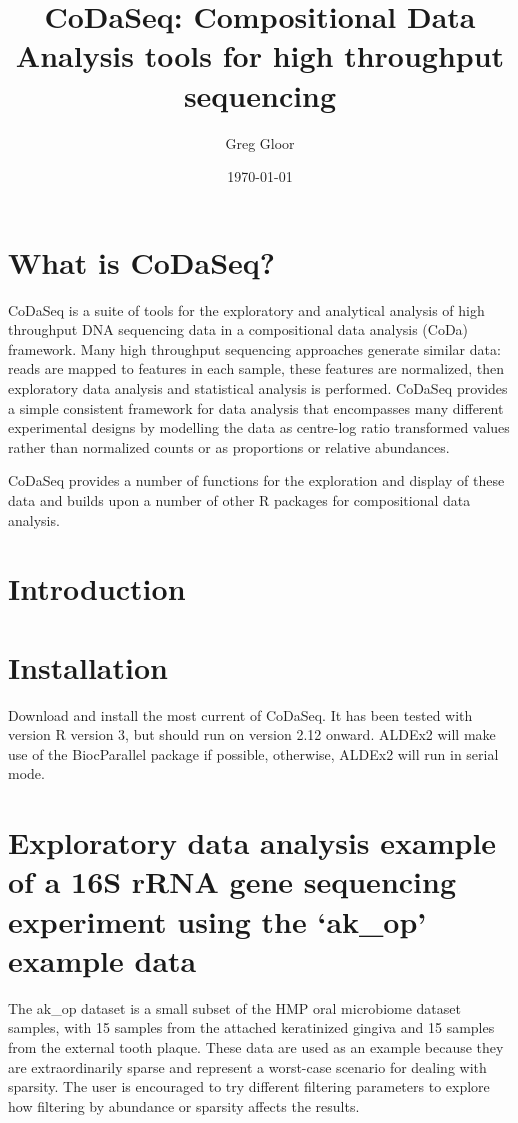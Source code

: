 \documentclass[11pt]{article}
\title{CoDaSeq: Compositional Data Analysis tools for high throughput sequencing}
\author{Greg Gloor}
\date{\today}                                           %
\begin{document}
\maketitle
\tableofcontents
\section{What is CoDaSeq?}
CoDaSeq is a suite of tools for the exploratory and analytical analysis of high throughput DNA sequencing data in a compositional data analysis (CoDa) framework. Many high throughput sequencing approaches generate similar data: reads are mapped to features in each sample, these features are normalized, then exploratory data analysis and statistical analysis is performed. CoDaSeq provides a simple consistent framework for data analysis that encompasses many different experimental designs by modelling the data as centre-log ratio transformed values rather than normalized counts or as proportions or relative abundances.

CoDaSeq provides a number of functions for the exploration and display of these data and builds upon a number of other R packages for compositional data analysis.

\section{Introduction}

\section{Installation}
Download and install the most current of CoDaSeq. It has been tested with version R version 3, but should run on version 2.12 onward. ALDEx2 will make use of the BiocParallel package if possible, otherwise, ALDEx2 will run in serial mode.

\section{Exploratory data analysis example of a 16S rRNA gene sequencing experiment using the `ak\_op' example data}

The ak\_op dataset is a small subset of the HMP oral microbiome dataset samples, with 15 samples from the attached keratinized gingiva and 15 samples from the external tooth plaque. These data are used as an example because they are extraordinarily sparse and represent a worst-case scenario for dealing with sparsity. The user is encouraged to try different filtering parameters to explore how filtering by abundance or sparsity affects the results.
\end{document}
